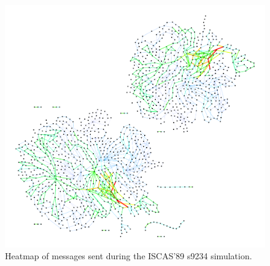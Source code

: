 \documentclass[11pt]{book}
\begin{document}
\begin{figure}
\centering
\includegraphics[width=\textwidth,height=0.9\textheight,keepaspectratio]{figs/s9234}
\caption{Heatmap of messages sent during the ISCAS'89 s9234 simulation.}
\end{figure}
\end{document}
